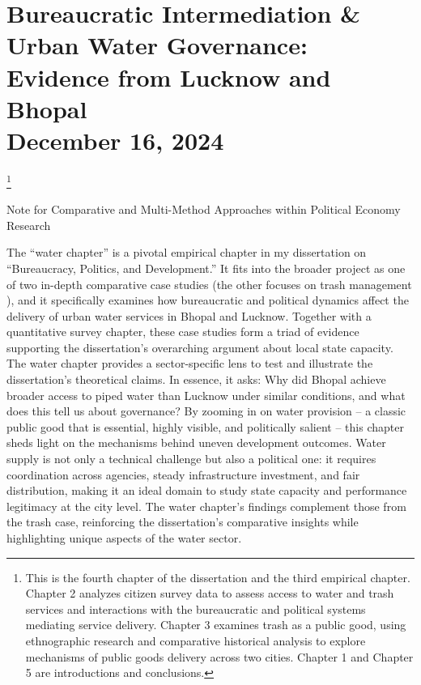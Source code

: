 

\chapter{Bureaucratic Intermediation \& Urban Water Governance: Evidence from Lucknow and Bhopal \\ \large December 16, 2024}\footnote{This is the fourth chapter of the dissertation and the third empirical chapter. Chapter 2 analyzes citizen survey data to assess access to water and trash services and interactions with the bureaucratic and political systems mediating service delivery. Chapter 3 examines trash as a public good, using ethnographic research and comparative historical analysis to explore mechanisms of public goods delivery across two cities. Chapter 1 and Chapter 5 are introductions and conclusions.}

\clearpage %

\date{}

\pagebreak
Note for Comparative and Multi-Method Approaches within Political Economy Research


The “water chapter” is a pivotal empirical chapter in my dissertation on “Bureaucracy, Politics, and Development.” It fits into the broader project as one of two in-depth comparative case studies (the other focuses on trash management ), and it specifically examines how bureaucratic and political dynamics affect the delivery of urban water services in Bhopal and Lucknow. Together with a quantitative survey chapter, these case studies form a triad of evidence supporting the dissertation’s overarching argument about local state capacity. The water chapter provides a sector-specific lens to test and illustrate the dissertation’s theoretical claims. In essence, it asks: Why did Bhopal achieve broader access to piped water than Lucknow under similar conditions, and what does this tell us about governance?
By zooming in on water provision – a classic public good that is essential, highly visible, and politically salient – this chapter sheds light on the mechanisms behind uneven development outcomes. Water supply is not only a technical challenge but also a political one: it requires coordination across agencies, steady infrastructure investment, and fair distribution, making it an ideal domain to study state capacity and performance legitimacy at the city level. The water chapter’s findings complement those from the trash case, reinforcing the dissertation’s comparative insights while highlighting unique aspects of the water sector.

